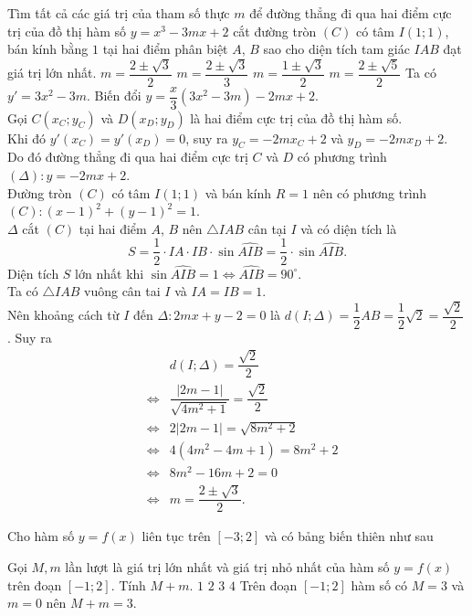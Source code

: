 \begin{ex}%
Tìm tất cả các giá trị của tham số thực $m$ để đường thẳng đi qua hai điểm cực trị của đồ thị hàm số $y=x^3-3mx+2$ cắt đường tròn $(C)$ có tâm $I(1;1)$, bán kính bằng $1$ tại hai điểm phân biệt $A$, $B$ sao cho diện tích tam giác $IAB$ đạt giá trị lớn nhất.
\choice
{\True $m=\dfrac{2\pm\sqrt{3}}{2}$}
{$m=\dfrac{2\pm\sqrt{3}}{3}$}
{$m=\dfrac{1\pm\sqrt{3}}{2}$}
{$m=\dfrac{2\pm\sqrt{5}}{2}$}
\loigiai
{
Ta có $y'=3x^2-3m$. Biến đổi $y=\dfrac{x}{3}(3x^2-3m)-2mx+2$.\\
Gọi $C(x_C;y_C)$ và $D(x_D;y_D)$ là hai điểm cực trị của đồ thị hàm số.\\
Khi đó $y'(x_C)=y'(x_D)=0$, suy ra $y_C=-2mx_C+2$ và $y_D=-2mx_D+2$.\\
Do đó đường thẳng đi qua hai điểm cực trị $C$ và $D$ có phương trình $(\Delta) \colon y=-2mx+2$.\\
Đường tròn $(C)$ có tâm $I(1;1)$ và bán kính $R=1$ nên có phương trình $(C)\colon (x-1)^2+(y-1)^2=1$.\\
$\Delta$ cắt $(C)$ tại hai điểm $A$, $B$ nên $\triangle IAB$ cân tại $I$ và có diện tích là
$$S=\dfrac{1}{2} \cdot IA \cdot IB \cdot \sin \widehat{AIB}= \dfrac{1}{2} \cdot \sin \widehat{AIB}.$$
Diện tích $S$ lớn nhất khi $\sin \widehat{AIB}=1 \Leftrightarrow \widehat{AIB}=90^\circ$.\\
Ta có $\triangle IAB$ vuông cân tai $I$ và $IA=IB=1$.\\
Nên khoảng cách từ $I$ đến $\Delta \colon 2mx+y-2=0$ là $d(I; \Delta)= \dfrac{1}{2} AB = \dfrac{1}{2} \sqrt{2} =\dfrac{\sqrt{2}}{2}$. Suy ra 
  \begin{eqnarray*}
  && d(I; \Delta)=\dfrac{\sqrt{2}}{2}\\
  & \Leftrightarrow & \dfrac{|2m-1|}{\sqrt{4m^2+1}}=\dfrac{\sqrt{2}}{2}\\
   & \Leftrightarrow & 2|2m-1|=\sqrt{8m^2+2}\\
    & \Leftrightarrow & 4(4m^2-4m+1)=8m^2+2\\
      & \Leftrightarrow & 8m^2-16m+2=0\\
      & \Leftrightarrow & m=\dfrac{2\pm\sqrt{3}}{2}.
  \end{eqnarray*}
}
\end{ex}
\begin{ex}%
Cho hàm số $y=f(x)$ liên tục trên $[-3;2]$ và có bảng biến thiên như sau
\begin{center}
\end{center}
Gọi $M, m$ lần lượt là giá trị lớn nhất và giá trị nhỏ nhất của hàm số $y=f(x)$ trên đoạn $[-1;2] $. Tính $M+m $.
\choice
{$1$}
{$2$}
{\True $3$}
{$4$}
\loigiai
{
Trên đoạn $[-1;2] $ hàm số có $M=3$ và $m=0$ nên $M+m=3$.
}
\end{ex}
